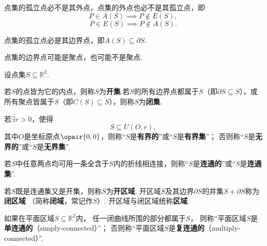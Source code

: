 \begin{property}
点集的孤立点必不是其外点，点集的外点也必不是其孤立点，即\[
P \in A(S) \implies P \notin E(S),
\]\[
P \in E(S) \implies P \notin A(S).
\]
\end{property}

\begin{property}
点集的孤立点必是其边界点，即\(A(S) \subseteq \partial{S}\).
\end{property}

\begin{property}
点集的边界点可能是聚点，也可能不是聚点.
\end{property}

\begin{definition}
设点集\(S \subseteq \mathbb{R}^2\).

若\(S\)的点皆为它的内点，则称\(S\)为\textbf{开集}.若\(S\)的所有边界点都属于\(S\)（即\(\partial S \subseteq S\)），或所有聚点皆属于\(S\)（即\(C(S) \subseteq S\)），则称\(S\)为\textbf{闭集}.

若\(\exists r > 0\)，使得\[
S \subseteq U(O,r),
\]其中\(O\)是坐标原点\(\opair{0,0}\)，则称“\(S\)是\textbf{有界的}”或“\(S\)是\textbf{有界集}”；
否则称“\(S\)是\textbf{无界的}”或“\(S\)是\textbf{无界集}”.

若\(S\)中任意两点均可用一条全含于\(S\)内的折线相连接，则称“\(S\)是\textbf{连通的}”或“\(S\)是\textbf{连通集}”.

若\(S\)既是连通集又是开集，则称\(S\)为\textbf{开区域}.
开区域\(S\)及其边界\(\partial S\)的并集\(S + \partial S\)称为\textbf{闭区域}%
（简称\textbf{闭域}，常记作\(\overline{S}\)）.
开区域与闭区域统称\textbf{区域}.
\end{definition}

\begin{definition}\label{definition:集合论.平面区域的连通性}
如果在平面区域\(S \subseteq \mathbb{R}^2\)内，%
任一闭曲线所围的部分都属于\(S\)，%
则称“平面区域\(S\)是\textbf{单连通的}（simply-connected）”；
否则称“平面区域\(S\)是\textbf{复连通的}（multiply-connected）”.
\end{definition}
